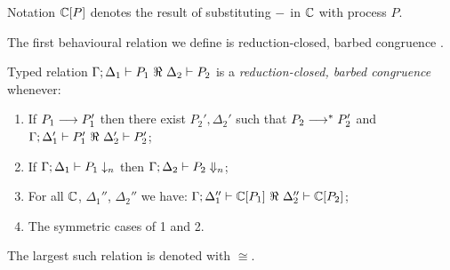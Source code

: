 \documentclass[a4paper,UKenglish]{lipics}
\theoremstyle{definition}
\begin{document}
Notation ${\Bbb C}[P]$ denotes the result of substituting 
$-$ in ${\Bbb C}$ with process $P$.


\noi The first behavioural relation we define is reduction-closed, barbed congruence \cite{HondaKYoshida95}. 

\begin{definition}\rm
\label{def:rc}
	Typed relation
	$\horel{\Gamma}{\Delta_1}{P_1}{\ \Re\ }{\Delta_2}{P_2}$
	is a {\em reduction-closed, barbed congruence} whenever:
	\begin{enumerate}[1)]
		\item	If $P_1 \longrightarrow P_1'$ then there exist $P_2', \Delta_2'$ such that $P_2 \longrightarrow^* P_2'$ and
			$\horel{\Gamma}{\Delta_1'}{P_1'}{\ \Re\ }{\Delta_2'}{P_2'}$;%

			\item	If $\Gamma;\Delta_1 \vdash P_1 \downarrow_{n}$ then $\Gamma;\Delta_2 \vdash P_2 \Downarrow_{n}$;%


		\item	For all ${\Bbb C}$, $\Delta_1''$, $\Delta_2''$ we have: $\horel{\Gamma}{\Delta_1''}{\context{\C}{P_1}}{\ \Re\ }{\Delta_2''}{\context{\C}{P_2}}$; 

		                      \item	The symmetric cases of 1 and 2.                
	\end{enumerate}
	The largest such relation is denoted with $\cong$.
\end{definition}
\end{document}
